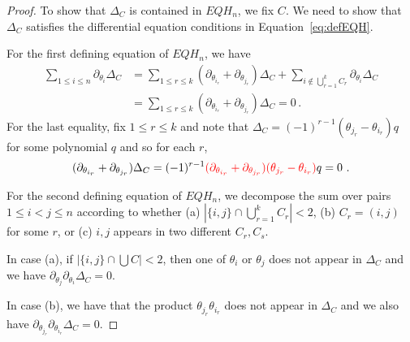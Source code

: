 \documentclass[11pt]{amsart}
\theoremstyle{definition}
\numberwithin{equation}{section}
\begin{document}
\begin{proof}
To show that  $\Delta_C$ is  contained in $EQH_n $, we fix $C$. We need to show that $\Delta_C$ satisfies the differential equation conditions in Equation~\eqref{eq:defEQH}.

For the first  defining equation of $EQH_n$, we have
\begin{align*}
 \sum_{1\le i\le n} \partial_{\theta_i}\Delta_C&=\sum_{1\le r\le k}  (\partial_{\theta_{i_r}}+\partial_{\theta_{j_r}})\Delta_C + \sum_{i\notin \bigcup_{r=1}^k C_r}  \partial_{\theta_i}\Delta_C\\
 &=\sum_{1\le r\le k}  (\partial_{\theta_{i_r}}+\partial_{\theta_{j_r}})\Delta_C =0\,.
  \end{align*}
For the last equality, fix $1\le r\le k$ and note that
$\Delta_C =(-1)^{r-1}(\theta_{j_r}-\theta_{i_r}) q$ for some  polynomial $q$
and so for each $r$,
$$(\partial_{\theta_{i_r}}+\partial_{\theta_{j_r}})\Delta_C=(-1)^{r-1}
\textcolor{red}{(\partial_{\theta_{i_r}}+\partial_{\theta_{j_r}})(\theta_{j_r}-\theta_{i_r})}q =0~.
$$

For the second defining equation of $EQH_n $, we decompose the sum over pairs $1\le i<j\le n$ according to
whether (a) $|\{i,j\}\cap \bigcup_{r=1}^k C_r|<2$, (b) $C_r = (i,j)$ for some $r$, or
(c) $i,j$ appears in two different $C_{r},C_{s}$.

In case (a), if  $|\{i,j\}\cap \bigcup C|<2$, then one of $\theta_i$ or $\theta_j$ does not appear in $\Delta_C$ and we have $ \partial_{\theta_j} \partial_{\theta_i}\Delta_C=0$.

In case (b), we have that the product $\theta_{j_r}\theta_{i_r}$ does not appear in $\Delta_C$ and we also have $ \partial_{\theta_{j_r}} \partial_{\theta_{i_r}}\Delta_C=0$.


\end{proof}
\end{document}

